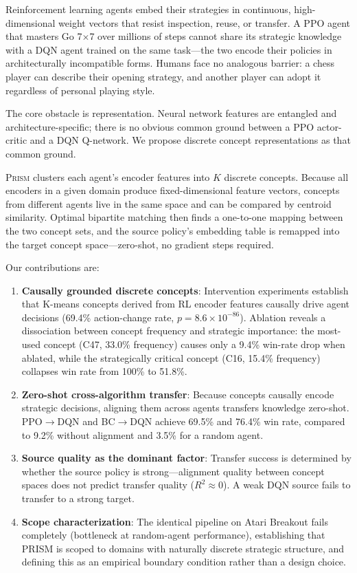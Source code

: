\documentclass[11pt,a4paper]{article}
\newcommand{\prism}{\textsc{Prism}}
\begin{document}
Reinforcement learning agents embed their strategies in continuous, high-dimensional weight vectors that resist inspection, reuse, or transfer. A PPO agent that masters Go 7$\times$7 over millions of steps cannot share its strategic knowledge with a DQN agent trained on the same task---the two encode their policies in architecturally incompatible forms. Humans face no analogous barrier: a chess player can describe their opening strategy, and another player can adopt it regardless of personal playing style.

The core obstacle is representation. Neural network features are entangled and architecture-specific; there is no obvious common ground between a PPO actor-critic and a DQN Q-network. We propose discrete concept representations as that common ground.

\prism{} clusters each agent's encoder features into $K$ discrete concepts. Because all encoders in a given domain produce fixed-dimensional feature vectors, concepts from different agents live in the same space and can be compared by centroid similarity. Optimal bipartite matching then finds a one-to-one mapping between the two concept sets, and the source policy's embedding table is remapped into the target concept space---zero-shot, no gradient steps required.

Our contributions are:
\begin{enumerate}[leftmargin=*]
    \item \textbf{Causally grounded discrete concepts}: Intervention experiments establish that K-means concepts derived from RL encoder features causally drive agent decisions (69.4\% action-change rate, $p = 8.6 \times 10^{-86}$). Ablation reveals a dissociation between concept frequency and strategic importance: the most-used concept (C47, 33.0\% frequency) causes only a 9.4\% win-rate drop when ablated, while the strategically critical concept (C16, 15.4\% frequency) collapses win rate from 100\% to 51.8\%.
    \item \textbf{Zero-shot cross-algorithm transfer}: Because concepts causally encode strategic decisions, aligning them across agents transfers knowledge zero-shot. PPO$\to$DQN and BC$\to$DQN achieve 69.5\% and 76.4\% win rate, compared to 9.2\% without alignment and 3.5\% for a random agent.
    \item \textbf{Source quality as the dominant factor}: Transfer success is determined by whether the source policy is strong---alignment quality between concept spaces does not predict transfer quality ($R^2 \approx 0$). A weak DQN source fails to transfer to a strong target.
    \item \textbf{Scope characterization}: The identical pipeline on Atari Breakout fails completely (bottleneck at random-agent performance), establishing that PRISM is scoped to domains with naturally discrete strategic structure, and defining this as an empirical boundary condition rather than a design choice.
\end{enumerate}
\end{document}
